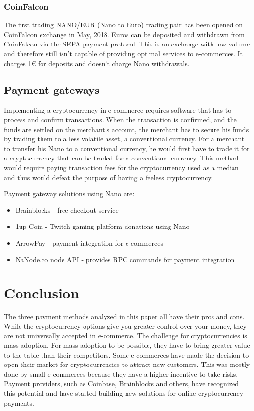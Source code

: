 \documentclass{ferseminar}
\begin{document}
\subsubsection{CoinFalcon}
The first trading NANO/EUR (Nano to Euro) trading pair has been opened on CoinFalcon exchange in May, 2018. Euros can be deposited and withdrawn from CoinFalcon via the SEPA payment protocol. This is an exchange with low volume and therefore still isn't capable of providing optimal services to e-commerces. It charges 1€ for deposits and doesn't charge Nano withdrawals. 
 
\subsection{Payment gateways}
Implementing a cryptocurrency in e-commerce requires software that has to process and confirm transactions. When the transaction is confirmed, and the funds are settled on the merchant's account, the merchant has to secure his funds by trading them to a less volatile asset, a conventional currency. For a merchant to transfer his Nano to a conventional currency, he would first have to trade it for a cryptocurrency that can be traded for a conventional currency. This method would require paying transaction fees for the cryptocurrency used as a median and thus would defeat the purpose of having a feeless cryptocurrency. 

Payment gateway solutions using Nano are:
\begin{itemize}
	\item Brainblocks -  free checkout service
	\item 1up Coin - Twitch gaming platform donations using Nano
	\item ArrowPay - payment integration for e-commerces
	\item NaNode.co node API - provides RPC commands for payment integration
\end{itemize}

\section{Conclusion}
The three payment methods analyzed in this paper all have their pros and cons. While the cryptocurrency options give you greater control over your money, they are not universally accepted in e-commerce. The challenge for cryptocurrencies is mass adoption. For mass adoption to be possible, they have to bring greater value to the table than their competitors. Some e-commerces have made the decision to open their market for cryptocurrencies to attract new customers. This was mostly done by small e-commerces because they have a higher incentive to take risks. Payment providers, such as Coinbase, Brainblocks and others, have recognized this potential and have started building new solutions for online cryptocurrency payments.
\end{document}

